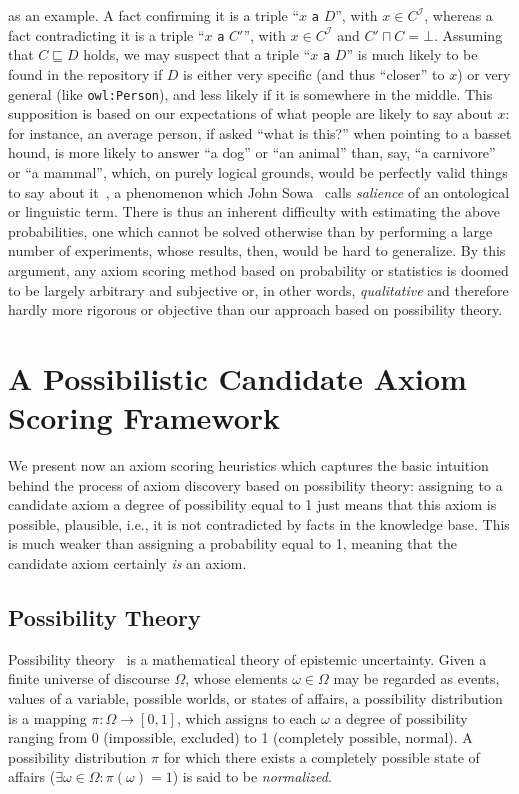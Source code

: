 \documentclass[review]{elsarticle}
\theoremstyle{definition}
\begin{document}
as an example. A fact confirming it is a triple ``$x$ \texttt{a} $D$'', with $x\in C^\mathcal{I}$,
whereas a fact contradicting it is a triple ``$x$ \texttt{a} $C'$'', with $x\in C^\mathcal{I}$
and $C' \sqcap C = \bot$. Assuming that $C \sqsubseteq D$ holds, we may suspect that
a triple ``$x$ \texttt{a} $D$'' is much likely to be found in the repository
if $D$ is either very specific (and thus ``closer'' to $x$) or very general (like
\texttt{owl:Person}), and less likely if it is somewhere in the middle.
This supposition is based on our expectations of what people are likely to say
about $x$: for instance, an average person, if asked ``what is this?'' when pointing
to a basset hound, is more likely to answer ``a dog'' or ``an animal'' than,
say, ``a carnivore'' or ``a mammal'', which, on purely logical grounds,
would be perfectly valid things to say about it~\cite{Lakoff1987},
a phenomenon which John Sowa~\cite{Sowa2000} %
calls \emph{salience} of an ontological or linguistic term.
There is thus an inherent difficulty with estimating the above probabilities,
one which cannot be solved otherwise than by performing a large number of
experiments, whose results, then, would be hard to generalize.
By this argument, any axiom scoring method based on probability or statistics is doomed
to be largely arbitrary and subjective or, in other words, \emph{qualitative}
and therefore hardly more rigorous or objective than our approach based on possibility theory.

\section{A Possibilistic Candidate Axiom Scoring Framework}
\label{possibility-theory}

We present now an axiom scoring heuristics which captures the basic intuition
behind the process of axiom discovery based on possibility theory: assigning to a candidate axiom a degree of possibility equal to 1 just means that this axiom is possible, plausible, i.e., it is not contradicted by facts in the knowledge base. This is  much weaker than assigning a probability equal to 1, meaning that the candidate axiom certainly \textit{is} an axiom.

\subsection{Possibility Theory}

Possibility theory~\cite{Zadeh1978} is a mathematical theory of epistemic uncertainty.
Given a finite universe of discourse $\Omega$, whose elements $\omega\in\Omega$
may be regarded as events, values of a variable, possible worlds, or states of affairs,
a possibility distribution is a mapping $\pi: \Omega \to [0, 1]$,
which assigns to each $\omega$ a degree of possibility ranging from 0 (impossible,
excluded) to 1 (completely possible, normal).
A possibility distribution $\pi$ for  which there exists a completely possible state of
affairs ($\exists \omega \in \Omega: \pi(\omega) = 1$) is said to be \emph{normalized}.
\end{document}
